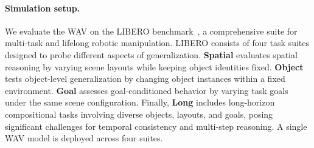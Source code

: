 

\paragraph{Simulation setup.} 
We evaluate the WAV on the LIBERO benchmark~\citep{liu2023libero}, a comprehensive suite for multi-task and lifelong robotic manipulation.
LIBERO consists of four task suites designed to probe different aspects of generalization.
\textbf{Spatial} evaluates spatial reasoning by varying scene layouts while keeping object identities fixed.
\textbf{Object} tests object-level generalization by changing object instances within a fixed environment.
\textbf{Goal} assesses goal-conditioned behavior by varying task goals under the same scene configuration.
Finally, \textbf{Long} includes long-horizon compositional tasks involving diverse objects, layouts, and goals, posing significant challenges for temporal consistency and multi-step reasoning.
A single WAV model is deployed across four suites.
